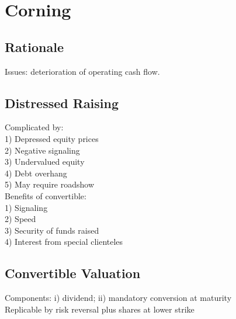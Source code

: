 \section{Corning}
	\subsection*{Rationale}
	Issues: deterioration of operating cash flow.
	
	\subsection*{Distressed Raising}
	Complicated by:\\
	1) Depressed equity prices\\
	2) Negative signaling\\
	3) Undervalued equity\\
	4) Debt overhang\\
	5) May require roadshow\\
	Benefits of convertible:\\
	1) Signaling\\
	2) Speed\\
	3) Security of funds raised\\
	4) Interest from special clienteles
	
	\subsection*{Convertible Valuation}
	Components: i) dividend; ii) mandatory conversion at maturity\\
	Replicable by risk reversal plus shares at lower strike
	